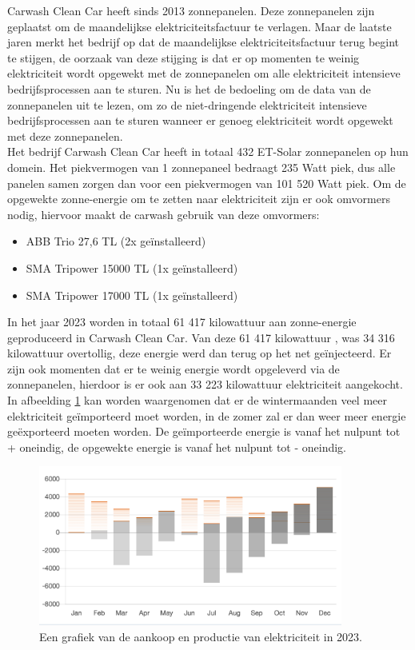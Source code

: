 Carwash Clean Car heeft sinds 2013 zonnepanelen. Deze zonnepanelen zijn geplaatst om de maandelijkse elektriciteitsfactuur te verlagen. Maar de laatste jaren merkt het bedrijf op dat de maandelijkse elektriciteitsfactuur terug begint te stijgen, de oorzaak van deze stijging is dat er op momenten te weinig elektriciteit wordt opgewekt met de zonnepanelen om alle elektriciteit intensieve bedrijfsprocessen aan te sturen. Nu is het de bedoeling om de data van de zonnepanelen uit te lezen, om zo de niet-dringende elektriciteit intensieve bedrijfsprocessen aan te sturen wanneer er genoeg elektriciteit wordt opgewekt met deze zonnepanelen.\\ Het bedrijf Carwash Clean Car heeft in totaal 432 ET-Solar zonnepanelen op hun domein. Het piekvermogen van 1 zonnepaneel bedraagt 235 Watt piek, dus alle panelen samen zorgen dan voor een piekvermogen van 101 520 Watt piek. Om de opgewekte zonne-energie om te zetten naar elektriciteit zijn er ook omvormers nodig, hiervoor maakt de carwash gebruik van deze omvormers:

\begin{itemize}
    \item ABB Trio 27,6 TL (2x geïnstalleerd)
    \item SMA Tripower 15000 TL (1x geïnstalleerd)
    \item SMA Tripower 17000 TL (1x geïnstalleerd)
\end{itemize}

In het jaar 2023 worden in totaal 61 417 kilowattuur aan zonne-energie geproduceerd in Carwash Clean Car. Van deze 61 417 kilowattuur , was 34 316 kilowattuur overtollig, deze energie werd dan terug op het net geïnjecteerd. Er zijn ook momenten dat er te weinig energie wordt opgeleverd via de zonnepanelen, hierdoor is er ook aan 33 223 kilowattuur elektriciteit aangekocht. In afbeelding \ref{fig:energie-productie-2023} kan worden waargenomen dat er de wintermaanden veel meer elektriciteit geïmporteerd moet worden, in de zomer zal er dan weer meer energie geëxporteerd moeten worden. De geïmporteerde energie is vanaf het nulpunt tot + oneindig, de opgewekte energie is vanaf het nulpunt tot - oneindig.

\begin{figure}[h]
    \includegraphics[width=10cm]{./graphics/Energie-opbrengsten-2023}
    \caption{Een grafiek van de aankoop en productie van elektriciteit in 2023.}
    \label{fig:energie-productie-2023}
\end{figure}

